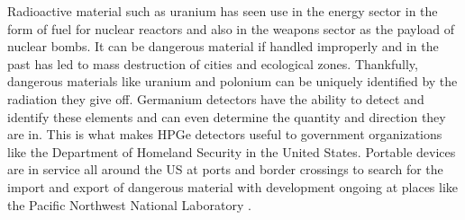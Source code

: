 Radioactive material such as uranium has seen use in the energy sector in the form of fuel for nuclear reactors and also in the weapons sector as the payload of nuclear bombs.
It can be dangerous material if handled improperly and in the past has led to mass destruction of cities and ecological zones.
Thankfully, dangerous materials like uranium and polonium can be uniquely identified by the radiation they give off.
Germanium detectors have the ability to detect and identify these elements and can even determine the quantity and direction they are in.
This is what makes HPGe detectors useful to government organizations like the Department of Homeland Security in the United States.
Portable devices are in service all around the US at ports and border crossings to search for the import and export of dangerous material with development ongoing at places like the Pacific Northwest National Laboratory \cite{StaveHS}.

